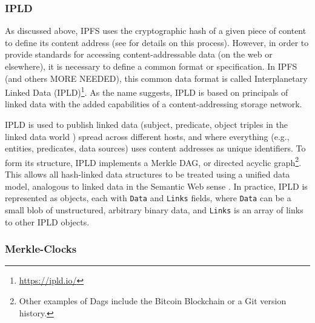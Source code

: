 \documentclass{textile}
\begin{document}
\subsubsection{IPLD}

As discussed above, IPFS uses the cryptographic hash of a given piece of content to define its content address (see \cite{benetIPFSContentAddressed2014} for details on this process). However, in order to provide standards for accessing content-addressable data (on the web or elsewhere), it is necessary to define a common format or specification. In IPFS (and others \cite[e.g.,]{protocollabsFilecoinDecentralizedStorage2017} MORE NEEDED), this common data format is called Interplanetary Linked Data (IPLD)\footnote{\url{https://ipld.io/}}. As the name suggests, IPLD is based on principals of linked data \cite{berners-leeLinkedData2009,bizerLinkedDataStory2011} with the added capabilities of a content-addressing storage network. 

IPLD is used to publish linked data (subject, predicate, object triples in the linked data world \cite{heathLinkedDataEvolving2011}) spread across different hosts, and where everything (e.g., entities, predicates, data sources) uses content addresses as unique identifiers. To form its structure, IPLD implements a Merkle DAG, or directed acyclic graph\footnote{Other examples of Dags include the Bitcoin Blockchain or a Git version history.}. This allows all hash-linked data structures to be treated using a unified data model, analogous to linked data in the Semantic Web sense \cite{brendanobrienDeterministicQueryingDistributed2017}. In practice, IPLD is represented as objects, each with \texttt{Data} and \texttt{Links} fields, where \texttt{Data} can be a small blob of unstructured, arbitrary binary data, and \texttt{Links} is an array of links to other IPLD objects. 

\subsubsection{Merkle-Clocks} \label{sec:merkleclocks}
\end{document}
